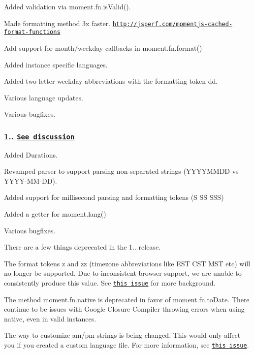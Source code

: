 Added validation via {\ttfamily moment.\+fn.\+is\+Valid()}.

Made formatting method 3x faster. \href{http://jsperf.com/momentjs-cached-format-functions}{\tt http\+://jsperf.\+com/momentjs-\/cached-\/format-\/functions}

Add support for month/weekday callbacks in {\ttfamily moment.\+fn.\+format()}

Added instance specific languages.

Added two letter weekday abbreviations with the formatting token {\ttfamily dd}.

Various language updates.

Various bugfixes.

\subsubsection*{1.. \href{https://github.com/timrwood/moment/pull/268}{\tt See discussion}}

Added Durations.

Revamped parser to support parsing non-\/separated strings (Y\+Y\+Y\+Y\+M\+M\+DD vs Y\+Y\+Y\+Y-\/\+M\+M-\/\+DD).

Added support for millisecond parsing and formatting tokens (S SS S\+SS)

Added a getter for {\ttfamily moment.\+lang()}

Various bugfixes.

There are a few things deprecated in the 1.. release.


\begin{DoxyEnumerate}
\item The format tokens {\ttfamily z} and {\ttfamily zz} (timezone abbreviations like E\+ST C\+ST M\+ST etc) will no longer be supported. Due to inconsistent browser support, we are unable to consistently produce this value. See \href{https://github.com/timrwood/moment/issues/162}{\tt this issue} for more background.
\item The method {\ttfamily moment.\+fn.\+native} is deprecated in favor of {\ttfamily moment.\+fn.\+to\+Date}. There continue to be issues with Google Closure Compiler throwing errors when using {\ttfamily native}, even in valid instances.
\item The way to customize am/pm strings is being changed. This would only affect you if you created a custom language file. For more information, see \href{https://github.com/timrwood/moment/pull/222}{\tt this issue}.
\end{DoxyEnumerate}


